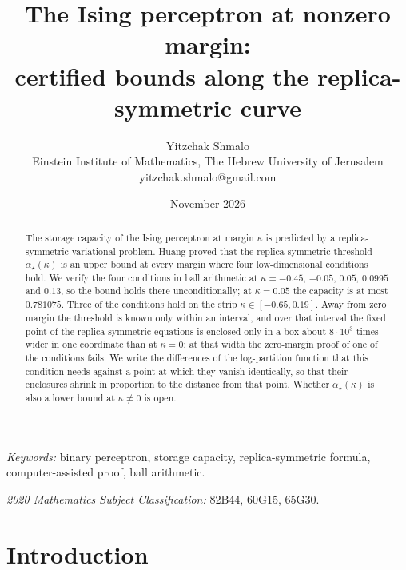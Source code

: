 \documentclass[11pt]{article}
\title{The Ising perceptron at nonzero margin:\\
certified bounds along the replica-symmetric curve}
\author{Yitzchak Shmalo\\
\small Einstein Institute of Mathematics, The Hebrew University of Jerusalem\\
\small yitzchak.shmalo@gmail.com}
\date{November 2026}
\theoremstyle{remark}
\begin{document}
\maketitle

\begin{abstract}
The storage capacity of the Ising perceptron at margin $\kappa$ is
predicted by a replica-symmetric variational problem.  Huang proved
that the replica-symmetric threshold $\alpha_\star(\kappa)$ is an upper bound
at every margin where four low-dimensional conditions hold.  We verify the four conditions in ball
arithmetic at $\kappa=-0.45$, $-0.05$, $0.05$, $0.0995$ and $0.13$, so
the bound holds there unconditionally; at $\kappa=0.05$ the
capacity is at most $0.781075$.  Three of the conditions hold on the
strip $\kappa\in[-0.65,0.19]$.  Away from zero margin the threshold is
known only within an interval, and over that interval the fixed point
of the replica-symmetric equations is enclosed only in a box about $8\cdot10^3$ times wider in one coordinate
than at $\kappa=0$; at that width the zero-margin
proof of one of the conditions fails.  We write the differences of the
log-partition function that this condition needs against a point at
which they vanish identically, so that their enclosures shrink in
proportion to the distance from that point.  Whether
$\alpha_\star(\kappa)$ is also a lower bound at $\kappa\ne0$ is open.
\end{abstract}

\noindent\emph{Keywords:} binary perceptron, storage capacity,
replica-symmetric formula, computer-assisted proof, ball arithmetic.

\noindent\emph{2020 Mathematics Subject Classification:} 82B44,
60G15, 65G30.

\section{Introduction}\label{sec:intro}
\end{document}
